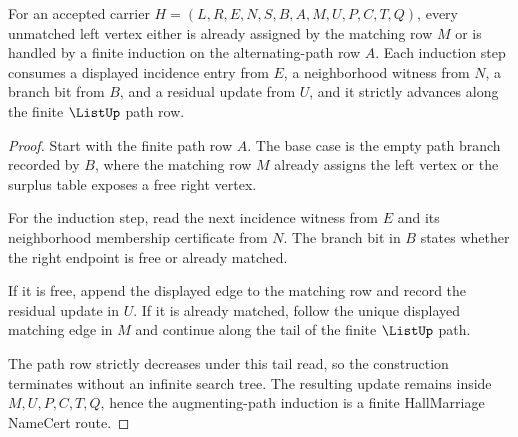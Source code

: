 \begin{theorem}
\label{thm:hall-marriage-augmenting-path-induction}
For an accepted carrier $H=(L,R,E,N,S,B,A,M,U,P,C,T,Q)$, every unmatched left vertex either is already assigned by the matching row $M$ or is handled by a finite induction on the alternating-path row $A$. Each induction step consumes a displayed incidence entry from $E$, a neighborhood witness from $N$, a branch bit from $B$, and a residual update from $U$, and it strictly advances along the finite $\ListUp$ path row.
\end{theorem}
\begin{proof}
Start with the finite path row $A$. The base case is the empty path branch recorded by $B$, where the matching row $M$ already assigns the left vertex or the surplus table exposes a free right vertex.

For the induction step, read the next incidence witness from $E$ and its neighborhood membership certificate from $N$. The branch bit in $B$ states whether the right endpoint is free or already matched.

If it is free, append the displayed edge to the matching row and record the residual update in $U$. If it is already matched, follow the unique displayed matching edge in $M$ and continue along the tail of the finite $\ListUp$ path.

The path row strictly decreases under this tail read, so the construction terminates without an infinite search tree. The resulting update remains inside $M,U,P,C,T,Q$, hence the augmenting-path induction is a finite HallMarriage NameCert route.
\end{proof}


\begin{closurestatus}{\HallMarriageUp}
  \theoryclosure{\seedClosure}
  \formalstatus{\unformalizedV}
\end{closurestatus}
